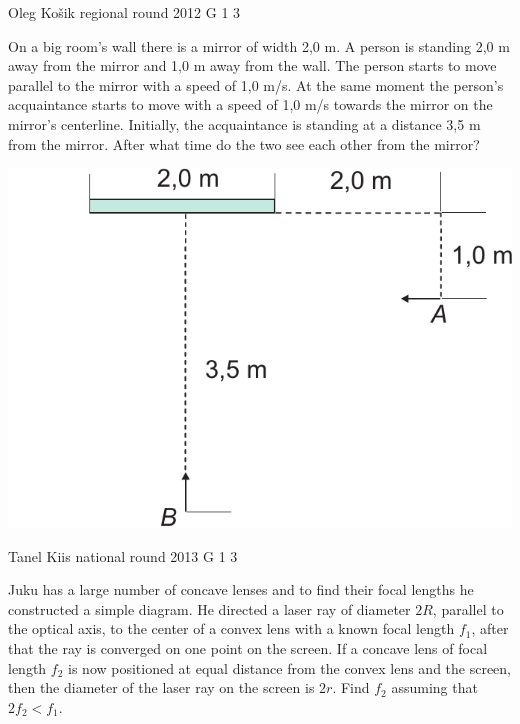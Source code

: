\documentclass[11pt]{article}
\begin{document}
{Oleg Košik} %
{regional round} %
{2012} %
{G 1} %
{3} %
{

\ifEngStatement
On a big room’s wall there is a mirror of width 2,0 m. A person is standing 2,0 m away from the mirror and 1,0 m away from the wall. The person starts to move parallel to the mirror with a speed of 1,0 m/s. At the same moment the person’s acquaintance starts to move with a speed of 1,0 m/s towards the mirror on the mirror’s centerline. Initially, the acquaintance is standing at a distance 3,5 m from the mirror. After what time do the two see each other from the mirror?
\begin{center}
\includegraphics[width=0.5\linewidth]{2012-v2g-01-peegel2}%
\end{center}
\fi
}

{Tanel Kiis} %
{national round} %
{2013} %
{G 1} %
{3} %
{

\ifEngStatement
Juku has a large number of concave lenses and to find their focal lengths he constructed a simple diagram. He directed a laser ray of diameter $2R$, parallel to the optical axis, to the center of a convex lens with a known focal length $f_1$, after that the ray is converged on one point on the screen. If a concave lens of focal length $f_2$ is now positioned at equal distance from the convex lens and the screen, then the diameter of the laser ray on the screen is $2r$. Find $f_2$ assuming that $2f_2 < f_1$.
\fi
}
\end{document}
